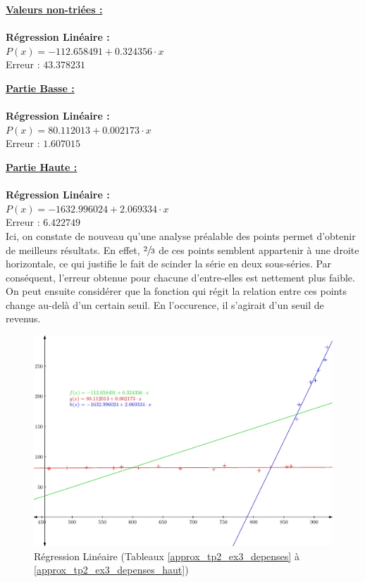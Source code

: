 \documentclass{report}
\begin{document}
	\noindent\underline{\textbf{Valeurs non-triées :}} \\ \\
	\textbf{Régression Linéaire :}\\
	$P(x) = - 112.658491 + 0.324356\cdot x$\\
	Erreur : $43.378231$
	\newline
	\newline
	
	\noindent\underline{\textbf{Partie Basse :}} \\ \\
	\textbf{Régression Linéaire :}\\
	$P(x) = 80.112013 + 0.002173\cdot x$\\
	Erreur : $1.607015$
	\newline
	\newline
	
	\noindent\underline{\textbf{Partie Haute :}} \\ \\
	\textbf{Régression Linéaire :}\\
	$P(x) = -1632.996024 + 2.069334\cdot x$\\
	Erreur : $6.422749$\\
	
	Ici, on constate de nouveau qu'une analyse préalable des points permet d'obtenir de meilleurs résultats. En effet, $\sfrac{2}{3}$ de ces points semblent appartenir à une droite horizontale, ce qui justifie le fait de scinder la série en deux sous-séries. Par conséquent, l'erreur obtenue pour chacune d'entre-elles est nettement plus faible. On peut ensuite considérer que la fonction qui régit la relation entre ces points change au-delà d'un certain seuil. En l'occurence, il s'agirait d'un seuil de revenus.
	\newpage
        \begin{figure}[h]
	  \centering
	  \includegraphics[scale=0.75]{graphiques/pdf_output/reglin_tp2_ex3.pdf}
	  \caption{Régression Linéaire (Tableaux \ref{approx_tp2_ex3_depenses} à \ref{approx_tp2_ex3_depenses_haut})}
        \end{figure}
      
\end{document}
